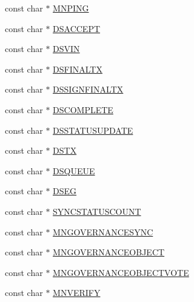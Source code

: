\begin{DoxyCompactItemize}
\item 
const char $\ast$ \mbox{\hyperlink{namespace_net_msg_type_a33dfb305e62e9e341acedec7041a2cef}{M\+N\+P\+I\+NG}}
\item 
const char $\ast$ \mbox{\hyperlink{namespace_net_msg_type_a22c5a983f12c44cd55f25f813a1eae9b}{D\+S\+A\+C\+C\+E\+PT}}
\item 
const char $\ast$ \mbox{\hyperlink{namespace_net_msg_type_a981eb2dfaefdde1edde3f23a4cb4c837}{D\+S\+V\+IN}}
\item 
const char $\ast$ \mbox{\hyperlink{namespace_net_msg_type_aad3898435e2b77c9635f029786675726}{D\+S\+F\+I\+N\+A\+L\+TX}}
\item 
const char $\ast$ \mbox{\hyperlink{namespace_net_msg_type_a205e90b72d502f0812c625706742272b}{D\+S\+S\+I\+G\+N\+F\+I\+N\+A\+L\+TX}}
\item 
const char $\ast$ \mbox{\hyperlink{namespace_net_msg_type_a9c0be319f6866d2392481057b37ba327}{D\+S\+C\+O\+M\+P\+L\+E\+TE}}
\item 
const char $\ast$ \mbox{\hyperlink{namespace_net_msg_type_aa2c782968549bd7dd946f6808c0fbeed}{D\+S\+S\+T\+A\+T\+U\+S\+U\+P\+D\+A\+TE}}
\item 
const char $\ast$ \mbox{\hyperlink{namespace_net_msg_type_a940262380a3195bbfe817102f62a4528}{D\+S\+TX}}
\item 
const char $\ast$ \mbox{\hyperlink{namespace_net_msg_type_a3474497e15b54b092474b572fd03384c}{D\+S\+Q\+U\+E\+UE}}
\item 
const char $\ast$ \mbox{\hyperlink{namespace_net_msg_type_a91f128191d673e3402f77a25abfbcd77}{D\+S\+EG}}
\item 
const char $\ast$ \mbox{\hyperlink{namespace_net_msg_type_aa2a144d4ca4cdecaf85f932f91407da2}{S\+Y\+N\+C\+S\+T\+A\+T\+U\+S\+C\+O\+U\+NT}}
\item 
const char $\ast$ \mbox{\hyperlink{namespace_net_msg_type_a5e19691196322e6db503a5c345e395b4}{M\+N\+G\+O\+V\+E\+R\+N\+A\+N\+C\+E\+S\+Y\+NC}}
\item 
const char $\ast$ \mbox{\hyperlink{namespace_net_msg_type_a3bb1f3815f0c2c2debd89083346a2c40}{M\+N\+G\+O\+V\+E\+R\+N\+A\+N\+C\+E\+O\+B\+J\+E\+CT}}
\item 
const char $\ast$ \mbox{\hyperlink{namespace_net_msg_type_a52af0d40ced25124f155a99ab487b85c}{M\+N\+G\+O\+V\+E\+R\+N\+A\+N\+C\+E\+O\+B\+J\+E\+C\+T\+V\+O\+TE}}
\item 
const char $\ast$ \mbox{\hyperlink{namespace_net_msg_type_a11e457f3f6a084d5ec306a57432d4f56}{M\+N\+V\+E\+R\+I\+FY}}
\end{DoxyCompactItemize}


